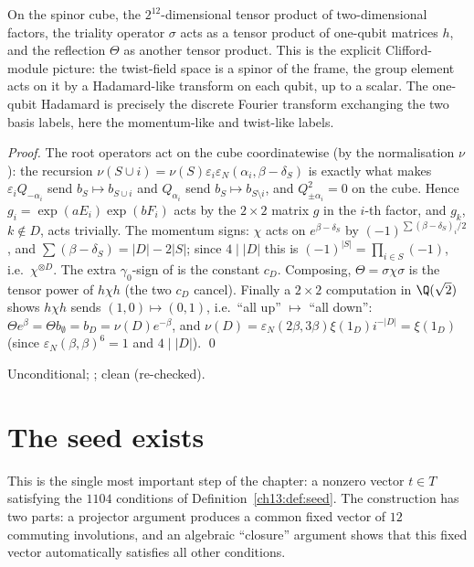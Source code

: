 \begin{physics}
On the spinor cube, the $2^{12}$-dimensional tensor product of two-dimensional factors, the triality operator $\sigma$ acts as a tensor product of one-qubit matrices $h$, and the reflection $\Theta$ as another tensor product. This is the explicit Clifford-module picture: the twist-field space is a spinor of the frame, the group element acts on it by a Hadamard-like transform on each qubit, up to a scalar. The one-qubit Hadamard is precisely the discrete Fourier transform exchanging the two basis labels, here the momentum-like and twist-like labels.
\end{physics}
\noindent\emph{Proof.} The root operators act on the cube coordinatewise (by the normalisation $\nu$):
the recursion $\nu(S\cup i)=\nu(S)\varepsilon_i\varepsilon_N(\alpha_i,\beta-\delta_S)$ is exactly what makes $\varepsilon_iQ_{-\alpha_i}$
send $b_S\mapsto b_{S\cup i}$ and $Q_{\alpha_i}$ send $b_S\mapsto b_{S\setminus i}$, and $Q_{\pm\alpha_i}^2=0$ on the cube. Hence
$g_i=\exp(aE_i)\exp(bF_i)$ acts by the $2\times2$ matrix $g$ in the $i$-th factor, and $g_k$, $k\notin D$, acts
trivially. The momentum signs: $\chi$ acts on $e^{\beta-\delta_S}$ by $(-1)^{\sum(\beta-\delta_S)_i/2}$, and
$\sum(\beta-\delta_S)=|D|-2|S|$; since $4\mid|D|$ this is $(-1)^{|S|}=\prod_{i\in S}(-1)$, i.e.\ $\chi^{\otimes D}$. The
extra $\gamma_0$-sign of  is the constant $c_D$. Composing, $\Theta=\sigma\chi\sigma$ is the tensor
power of $h\chi h$ (the two $c_D$ cancel). Finally a $2\times2$ computation in $\Q(\sqrt2)$ shows $h\chi h$ sends
$(1,0)\mapsto(0,1)$, i.e.\ ``all up'' $\mapsto$ ``all down'': $\Theta e^\beta=\Theta b_\emptyset=b_D=\nu(D)e^{-\beta}$, and
$\nu(D)=\varepsilon_N(2\beta,3\beta)\xi(1_D)i^{-|D|}=\xi(1_D)$ (since $\varepsilon_N(\beta,\beta)^6=1$ and $4\mid|D|$). \qed
\begin{status}Unconditional; ; 
clean (re-checked).\end{status}

\section{The seed exists}\label{ch13:sec:seed}

This is the single most important step of the chapter: a nonzero vector $t\in T$ satisfying the
$1104$ conditions of Definition~\ref{ch13:def:seed}. The construction has two parts: a projector argument
produces a common fixed vector of $12$ commuting involutions, and an algebraic ``closure'' argument
shows that this fixed vector automatically satisfies all other conditions.

